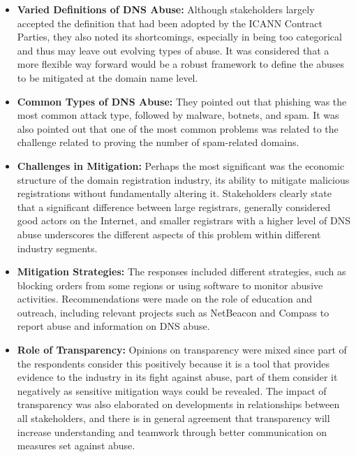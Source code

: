 \begin{itemize}
  \item \textbf{Varied Definitions of DNS Abuse:} Although stakeholders largely accepted the definition that had been adopted by the ICANN Contract Parties, they also noted its shortcomings, especially in being too categorical and thus may leave out evolving types of abuse. It was considered that a more flexible way forward would be a robust framework to define the abuses to be mitigated at the domain name level.
  
  \item \textbf{Common Types of DNS Abuse:} They pointed out that phishing was the most common attack type, followed by malware, botnets, and spam. It was also pointed out that one of the most common problems was related to the challenge related to proving the number of spam-related domains.
  
  \item \textbf{Challenges in Mitigation:} Perhaps the most significant was the economic structure of the domain registration industry, its ability to mitigate malicious registrations without fundamentally altering it. Stakeholders clearly state that a significant difference between large registrars, generally considered good actors on the Internet, and smaller registrars with a higher level of DNS abuse underscores the different aspects of this problem within different industry segments.
  
  \item \textbf{Mitigation Strategies:} The responses included different strategies, such as blocking orders from some regions or using software to monitor abusive activities. Recommendations were made on the role of education and outreach, including relevant projects such as NetBeacon and Compass to report abuse and information on DNS abuse.
  
  \item \textbf{Role of Transparency:} Opinions on transparency were mixed since part of the respondents consider this positively because it is a tool that provides evidence to the industry in its fight against abuse, part of them consider it negatively as sensitive mitigation ways could be revealed. The impact of transparency was also elaborated on developments in relationships between all stakeholders, and there is in general agreement that transparency will increase understanding and teamwork through better communication on measures set against abuse.
  
\end{itemize}

